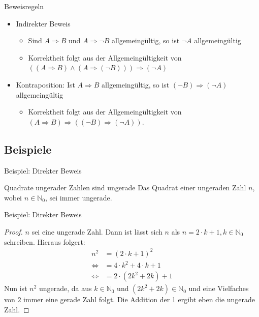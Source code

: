 \documentclass[12pt%
,aspectratio=169%
]{beamer}
\begin{document}
\begin{frame}{Beweisregeln}
\begin{itemize}
\item Indirekter Beweis
	\begin{itemize}
		\item Sind $A \Rightarrow B$ und $A \Rightarrow \neg B$ allgemeingültig, so ist $\neg A$ allgemeingültig
		\item Korrektheit folgt aus der Allgemeingültigkeit von $((A \Rightarrow B) \land (A \Rightarrow (\neg B))) \Rightarrow (\neg A)$
	\end{itemize}
	\item Kontraposition:  Ist $A \Rightarrow B$ allgemeingültig, so ist $(\neg B) \Rightarrow (\neg A)$ allgemeingültig
	\begin{itemize}
		\item Korrektheit folgt aus der Allgemeingültigkeit von $(A \Rightarrow B) \Rightarrow ((\neg B) \Rightarrow (\neg A))$.
	\end{itemize}
\end{itemize}
\end{frame}

\subsection{Beispiele}
\begin{frame}{Beispiel: Direkter Beweis}
\begin{theorem}{Quadrate ungerader Zahlen sind ungerade}
Das Quadrat einer ungeraden Zahl $n$, wobei $n \in \mathbb{N}_0$, sei immer ungerade.
\end{theorem}
\end{frame}

\begin{frame}{Beispiel: Direkter Beweis}
\begin{proof}
$n$ sei eine ungerade Zahl. Dann ist lässt sich $n$ als $n = 2 \cdot k + 1, k \in \mathbb{N}_0$ schreiben. Hieraus folgert:
\begin{align*}
n^2 &= (2 \cdot k +1 )^2\\
\Leftrightarrow &= 4 \cdot k^2 + 4 \cdot k + 1 \\
\Leftrightarrow &= 2 \cdot (2k^2 +2k) +1
\end{align*}
Nun ist $n^2$ ungerade, da aus $k \in \mathbb{N}_0$ und $(2k^2 +2k) \in \mathbb{N}_0$ und eine Vielfaches von $2$ immer eine gerade Zahl folgt. Die Addition der 1 ergibt eben die ungerade Zahl. 
\end{proof}
\end{frame}
\end{document}
